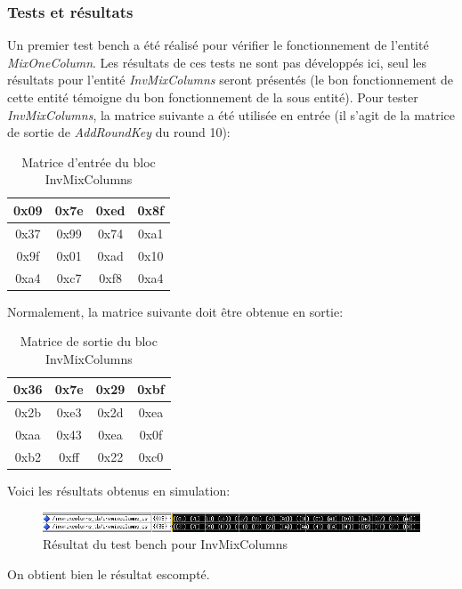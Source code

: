 \documentclass[a4paper, 12pt]{article}
\begin{document}
		\subsubsection{Tests et résultats}
Un premier test bench a été réalisé pour vérifier le fonctionnement de l'entité \emph{MixOneColumn}. Les résultats de ces tests ne sont pas développés ici, seul les résultats pour l'entité \emph{InvMixColumns} seront présentés (le bon fonctionnement de cette entité témoigne du bon fonctionnement de la sous entité). Pour tester \emph{InvMixColumns}, la matrice suivante a été utilisée en entrée (il s'agit de la matrice de sortie de \emph{AddRoundKey} du round 10):
			\begin{table}[H]
				\begin{center}
				\begin{tabular}{|c|c|c|c|}
					\hline
					0x09 & 0x7e & 0xed & 0x8f \\
					\hline
					0x37 & 0x99 & 0x74 & 0xa1 \\
					\hline
					0x9f & 0x01 & 0xad & 0x10 \\
					\hline
					0xa4 & 0xc7 & 0xf8 & 0xa4 \\
					\hline
				\end{tabular}
				\caption{Matrice d'entrée du bloc InvMixColumns}
				\label{MatriceEntreeInvMixColumns}
				\end{center}
			\end{table}
			Normalement, la matrice suivante doit être obtenue en sortie:
			\begin{table}[H]
				\begin{center}
				\begin{tabular}{|c|c|c|c|}
					\hline
					0x36 & 0x7e & 0x29 & 0xbf \\
					\hline
					0x2b & 0xe3 & 0x2d & 0xea \\
					\hline
					0xaa & 0x43 & 0xea & 0x0f \\
					\hline
					0xb2 & 0xff & 0x22 & 0xc0 \\
					\hline
				\end{tabular}
				\caption{Matrice de sortie du bloc InvMixColumns}
				\label{MatriceSortieInvMixColumns}
				\end{center}
			\end{table}
Voici les résultats obtenus en simulation:
			\begin{figure}[H]
				\begin{center}
				\includegraphics[scale=0.72]{Images/InvMixColumnsTb.png}
				\end{center}
				\caption{Résultat du test bench pour InvMixColumns}
				\label{InvMixColumnssTb}
			\end{figure}
On obtient bien le résultat escompté. 
\end{document}
